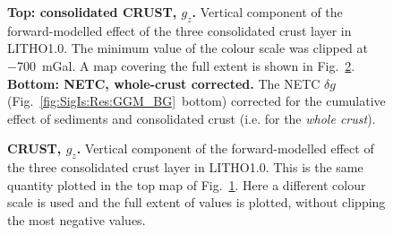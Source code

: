 \begin{figure}
    \begin{adjustbox}{center}
    \end{adjustbox}
    \caption[Map of the effect of the consolidated crust ($g_z$) and the NETC $\delta g$ corrected for the whole crust (including sediments).]{
        \textbf{Top: consolidated CRUST, $g_z$.} Vertical component of the forward-modelled effect of the three consolidated crust layer in {LITHO1.0}.
        The minimum value of the colour scale was clipped at \SI{-700}{mGal}. A map covering the full extent is shown in Fig.~\ref{fig:SigIs:Res:CRUST_NonTrim}.
        \textbf{Bottom: NETC, whole-crust corrected.} The NETC $\delta g$ (Fig.~\ref{fig:SigIs:Res:GGM_BG}~bottom) corrected for the cumulative effect of sediments and consolidated crust (i.e. for the \textit{whole crust}).
    }
    \label{fig:SigIs:Res:CRUST}
\end{figure}

\begin{figure}
    \begin{adjustbox}{center}
    \end{adjustbox}
    \caption[Map of the effect of the consolidated crust ($g_z$), full extent version.]{
        \textbf{CRUST, $g_z$.} Vertical component of the forward-modelled effect of the three consolidated crust layer in {LITHO1.0}.
        This is the same quantity plotted in the top map of Fig.~\ref{fig:SigIs:Res:CRUST}.
        Here a different colour scale is used and the full extent of values is plotted, without clipping the most negative values.
        }
    \label{fig:SigIs:Res:CRUST_NonTrim}
\end{figure}

